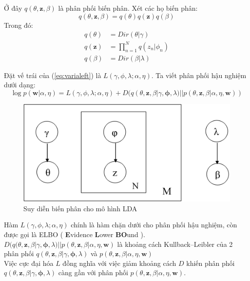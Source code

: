 \documentclass[fontsize=13pt]{scrartcl}
\begin{document}
Ở đây $q(\theta,\textbf{z},\beta) $ là phân phối biến phân. Xét các họ biến phân:
\begin{equation}
q(\theta,\textbf{z},\beta) = q(\theta)q(\textbf{z})q(\beta)
\end{equation}
Trong đó:
\begin{align}
q(\theta) &= Dir(\theta|\gamma)\\
q(\mathbf{z}) &= \prod_{n=1}^{N} q(z_n|\phi_n)\\
q(\beta) &= Dir(\beta | \lambda)
\end{align}

Đặt vế trái của (\ref{eq:varialeft}) là $L(\gamma,\phi,\lambda;\alpha,\eta)$. Ta viết phân phối hậu nghiệm dưới dạng:
\begin{equation}
\log p(\mathbf{w} | \alpha, \eta) = L(\gamma,\phi,\lambda;\alpha,\eta) + D(q(\theta,\mathbf{z},\beta| \gamma,\boldsymbol\phi,\lambda) || p(\theta,\mathbf{z},\beta | \alpha,\eta,\mathbf{w}))
\end{equation} 
\begin{figure}[H]
\begin{center}
\includegraphics[scale=0.6]{img/variationalinfer.png}
\end{center}
\label{fig:variationalinfer}
\caption{Suy diễn biến phân cho mô hình LDA}
\end{figure}
Hàm $L(\gamma,\phi,\lambda;\alpha,\eta)$ chính là hàm chặn dưới cho phân phối hậu nghiệm, còn được gọi là ELBO ( \textbf{E}vidence \textbf{L}ower \textbf{BO}und ). $D(q(\theta,\mathbf{z},\beta| \gamma,\boldsymbol\phi,\lambda) || p(\theta,\mathbf{z},\beta | \alpha,\eta,\mathbf{w})$ là khoảng cách Kullback–Leibler của 2 phân phối $q(\theta,\mathbf{z},\beta| \gamma,\boldsymbol\phi,\lambda)$ và $p(\theta,\mathbf{z},\beta | \alpha,\eta,\mathbf{w})$\\
Việc cực đại hóa $L$ đồng nghĩa với việc giảm khoảng cách $D$ khiến phân phối  $q(\theta,\mathbf{z},\beta| \gamma,\boldsymbol\phi,\lambda)$ càng gần với phân phối $p(\theta,\mathbf{z},\beta | \alpha,\eta,\mathbf{w})$.\\
\end{document}
